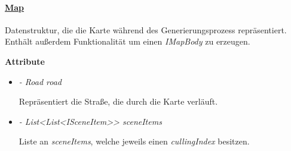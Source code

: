     
    
        \paragraph{\underline{Map}} \mbox{}\par
            Datenstruktur, die die Karte während des Generierungsprozess repräsentiert. Enthält außerdem Funktionalität um einen 
            \textit{IMapBody} zu erzeugen.\par
            
            \textbf{Attribute}
            \begin{itemize}
                \item  \textit{- Road road} 
                    \begin{leftbar}[0.9\linewidth]
                        Repräsentiert die Straße, die durch die Karte verläuft.
                    \end{leftbar}
                
                \item  \textit{- List<List<ISceneItem>> sceneItems} 
                    \begin{leftbar}[0.9\linewidth]
                        Liste an \textit{sceneItems}, welche jeweils einen \textit{cullingIndex} besitzen.
                    \end{leftbar}
            \end{itemize}

